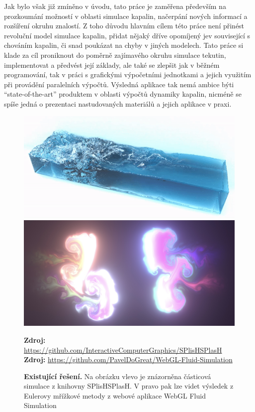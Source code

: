 Jak bylo však již zmíněno v úvodu, tato práce je zaměřena především na prozkoumání možností v oblasti simulace kapalin, načerpání nových informací a rozšíření okruhu znalostí. Z toho důvodu hlavním cílem této práce není přinést revoluční model simulace kapalin, přidat nějaký dříve opomíjený jev související s chováním kapalin, či snad poukázat na chyby v jiných modelech. Tato práce si klade za cíl proniknout do poměrně zajímavého okruhu simulace tekutin, implementovat a předvést její základy, ale také se zlepšit jak v běžném programování, tak v práci s grafickými výpočetními jednotkami a jejich využitím při provádění paralelních výpočtů. Výsledná aplikace tak nemá ambice býti \enquote{state-of-the-art} produktem v oblasti výpočtů dynamiky kapalin, nicméně se spíše jedná o prezentaci nastudovaných materiálů a jejich aplikace v praxi.

\begin{figure}[h]\centering
	\centering
	\captionsetup{justification=centering}
	\includegraphics[width=0.5\linewidth]{obrazky-figures/splish-0.png}\hfill
	\includegraphics[width=0.5\linewidth]{obrazky-figures/webglFluid.jpg}\hfill
	\caption{\textbf{Existující řešení.} Na obrázku vlevo je znázorněna částicová simulace z knihovny SPlisHSPlasH. V pravo pak lze videt výsledek z Eulerovy mřížkové metody z webové aplikace WebGL Fluid Simulation }
	\textbf{Zdroj: } \url{https://github.com/InteractiveComputerGraphics/SPlisHSPlasH} \newline
    \textbf{Zdroj: } \url{https://github.com/PavelDoGreat/WebGL-Fluid-Simulation}
	\label{fig:existingSolution}
\end{figure}

